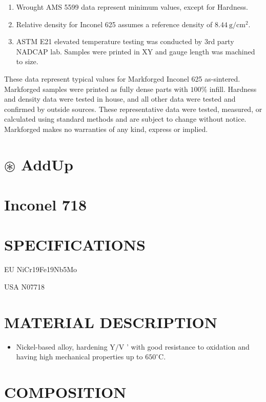 \documentclass[10pt]{article}
\begin{document}
\begin{enumerate}
  \item Wrought AMS 5599 data represent minimum values, except for Hardness.

  \item Relative density for Inconel 625 assumes a reference density of $8.44 \mathrm{~g} / \mathrm{cm}^{2}$.

  \item ASTM E21 elevated temperature testing was conducted by 3rd party NADCAP lab. Samples were printed in XY and gauge length was machined to size.

\end{enumerate}

These data represent typical values for Markforged Inconel 625 as-sintered. Markforged samples were printed as fully dense parts with $100 \%$ infill. Hardness and density data were tested in house, and all other data were tested and confirmed by outside sources. These representative data were tested, measured, or calculated using standard methods and are subject to change without notice. Markforged makes no warranties of any kind, express or implied.

\section*{$\circledast$ AddUp}
\section*{Inconel 718}
\section*{SPECIFICATIONS}
EU NiCr19Fe19Nb5Mo

USA N07718

\section*{MATERIAL DESCRIPTION}
\begin{itemize}
  \item Nickel-based alloy, hardening $\mathrm{Y} / \mathrm{V}$ ' with good resistance to oxidation and having high mechanical properties up to $650^{\circ} \mathrm{C}$.
\end{itemize}

\section*{COMPOSITION}
\end{document}
